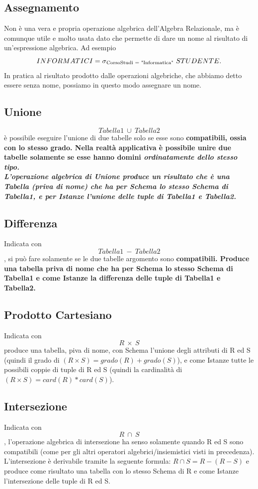 \documentclass[11pt]{article} %
\begin{document}
\subsection{Assegnamento}
Non è una vera e propria operazione algebrica dell'Algebra Relazionale, ma è comunque utile e molto usata dato che permette di dare un nome al risultato di un'espressione algebrica. Ad esempio $$ INFORMATICI = \sigma \textsubscript{CorsoStudi = "Informatica"}\  STUDENTE.$$ In pratica al risultato prodotto dalle operazioni algebriche, che abbiamo detto essere senza nome, possiamo in questo modo assegnare un nome.
\subsection{Unione}
$$ Tabella1\  \cup\  Tabella2 $$ è possibile eseguire l'unione di due tabelle solo se esse sono \bf compatibili\rm, ossia con lo stesso grado. Nella realtà applicativa è possibile unire due tabelle solamente se esse hanno domini \it ordinatamente dello stesso tipo.\rm\\
L'operazione algebrica di Unione produce un risultato che è una Tabella (priva di nome) che ha per Schema lo stesso Schema di Tabella1, e per Istanze l'unione delle tuple di Tabella1 e Tabella2.
\subsection{Differenza}
Indicata con $$ Tabella1\ -\ Tabella2 $$, si può fare solamente se le due tabelle argomento sono \bf compatibili\rm. Produce una tabella priva di nome che ha per Schema lo stesso Schema di Tabella1 e come Istanze la differenza delle tuple di Tabella1 e Tabella2.
\subsection{Prodotto Cartesiano}
Indicata con $$ R\ \times\ S $$ produce una tabella, piva di nome, con Schema l'unione degli attributi di R ed S (quindi il grado di \( (R \times S) = grado(R) + grado(S)\)), e come Istanze tutte le possibili coppie di tuple di R ed S (quindi la cardinalità di \( (R \times S) = card(R) * card(S)\)).
\subsection{Intersezione}
Indicata con $$ R\ \cap\ S $$, l'operazione algebrica di intersezione ha senso solamente quando R ed S sono compatibili (come per gli altri operatori algebrici/insiemistici visti in precedenza).\\
L'intersezione è derivabile tramite la seguente formula: \( R \cap S = R - (R - S) \) e produce come risultato una tabella con lo stesso Schema di R e come Istanze l'intersezione delle tuple di R ed S.
\end{document}
